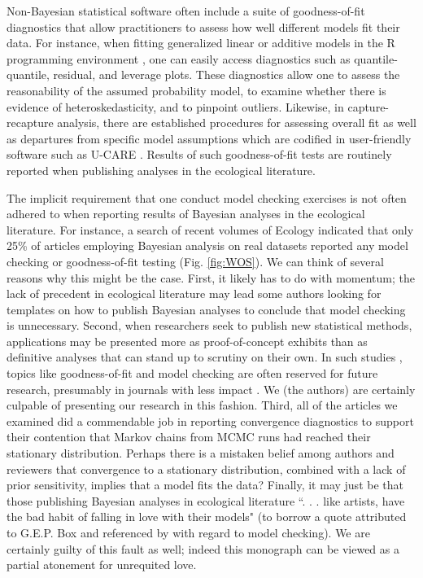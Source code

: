\documentclass[12pt,english]{article}
\begin{document}
\begin{spacing}{1.9}
Non-Bayesian statistical software often include a suite of goodness-of-fit diagnostics that allow practitioners to assess how well different models fit their data.  For instance, when fitting generalized linear \citep{McCullaghNelder1989} or additive \citep{Wood2006} models in the R programming environment \citep{RTeam2013}, one can easily access diagnostics such as quantile-quantile, residual, and leverage plots.  These diagnostics allow one to assess the reasonability of the assumed probability model, to examine whether there is evidence of heteroskedasticity, and to pinpoint outliers.  Likewise, in capture-recapture analysis, there are established procedures for assessing overall fit as well as departures from specific model assumptions which are codified in user-friendly software such as U-CARE \citep{ChoquetEtAl2009}.  Results of such goodness-of-fit tests are routinely reported when publishing analyses in the ecological literature.

The implicit requirement that one conduct model checking exercises is not often adhered to when reporting results of Bayesian analyses in the ecological literature.  For instance, a search of recent volumes of Ecology indicated that only 25\% of articles employing Bayesian analysis on real datasets reported any model checking or goodness-of-fit testing (Fig. \ref{fig:WOS}).  We can think of several reasons why this might be the case.  First, it likely has to do with momentum; the lack of precedent in ecological literature may lead some authors looking for templates on how to publish Bayesian analyses to conclude that model checking is unnecessary.  Second, when researchers seek to publish new statistical methods, applications may be presented more as proof-of-concept exhibits than as definitive analyses that can stand up to scrutiny on their own. In such studies \citep[and textbooks; see e.g.,][]{RoyleDorazio2008}, topics like goodness-of-fit and model checking are often reserved for future research, presumably in journals with less impact .  We (the authors) are certainly culpable of presenting our research in this fashion.  Third, all of the articles we examined did a commendable job in reporting convergence diagnostics to support their contention that Markov chains from MCMC runs had reached their stationary distribution.  Perhaps there is a mistaken belief among authors and reviewers that convergence to a stationary distribution, combined with a lack of prior sensitivity, implies that a model fits the data?  Finally, it may just be that those publishing Bayesian analyses in ecological literature ``. . . like artists, have the bad habit of falling in love with their models" (to borrow a quote attributed to G.E.P. Box and referenced by \citet{LinkBarker2010} with regard to model checking).  We are certainly guilty of this fault as well; indeed this monograph can be viewed as a partial atonement for unrequited love.


\end{spacing}
\end{document}

